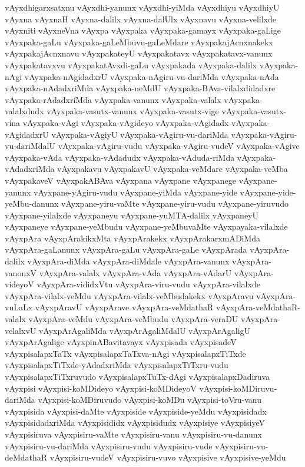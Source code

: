 {vAyxdhigarxsatxnu
vAyxdhi-yanunx
vAyxdhi-yiMda
vAyxdhiyu
vAyxdhiyU
vAyxna
vAyxnaH
vAyxna-dalilx
vAyxna-dalUlx
vAyxnavu
vAyxna-velilxde
vAyxniti
vAyxneVna
vAyxpa
vAyxpaka
vAyxpaka-gamayx
vAyxpaka-gaLige
vAyxpaka-gaLu
vAyxpaka-gaLeMbuvu-gaLeMdare
vAyxpakajAcnxnakekx
vAyxpakajAcnxnavu
vAyxpakateyU
vAyxpakatavx
vAyxpakatavx-vanunx
vAyxpakatavxvu
vAyxpakatAvxdi-gaLu
vAyxpakada
vAyxpaka-dalilx
vAyxpaka-nAgi
vAyxpaka-nAgidadxrU
vAyxpaka-nAgiru-vu-dariMda
vAyxpaka-nAda
vAyxpaka-nAdadxriMda
vAyxpaka-neMdU
vAyxpaka-BAva-vilalxdidadxre
vAyxpaka-rAdadxriMda
vAyxpaka-vanunx
vAyxpaka-valalx
vAyxpaka-valalxdudx
vAyxpaka-vasutx-vanunx
vAyxpaka-vasutx-vige
vAyxpaka-vasutx-vina
vAyxpaka-vAgi
vAyxpaka-vAgideyo
vAyxpaka-vAgidadx
vAyxpaka-vAgidadxrU
vAyxpaka-vAgiyU
vAyxpaka-vAgiru-vu-dariMda
vAyxpaka-vAgiru-vu-dariMdalU
vAyxpaka-vAgiru-vudu
vAyxpaka-vAgiru-vudeV
vAyxpaka-vAgive
vAyxpaka-vAda
vAyxpaka-vAdadudx
vAyxpaka-vAduda-riMda
vAyxpaka-vAdadxriMda
vAyxpakavu
vAyxpakavU
vAyxpaka-veMdare
vAyxpaka-veMba
vAyxpakaveV
vAyxpakABAva
vAyxpana
vAyxpane
vAyxpanege
vAyxpane-yanunx
vAyxpane-yAgiru-vudu
vAyxpane-yiMda
vAyxpane-yide
vAyxpane-yide-yeMbu-danunx
vAyxpane-yiru-vaMte
vAyxpane-yiru-vudu
vAyxpane-yiruvudo
vAyxpane-yilalxde
vAyxpaneyu
vAyxpane-yuMTA-dalilx
vAyxpaneyU
vAyxpaneye
vAyxpane-yeMbudu
vAyxpane-yeMbuvaMte
vAyxpayaka-vilalxde
vAyxpAra
vAyxpArakikxMta
vAyxpArakekx
vAyxpArakarxmADiMda
vAyxpAra-gaLanunx
vAyxpAra-gaLu
vAyxpAra-gaLe
vAyxpArada
vAyxpAra-dalilx
vAyxpAra-diMda
vAyxpAra-diMdale
vAyxpAra-vanunx
vAyxpAra-vanonxV
vAyxpAra-valalx
vAyxpAra-vAda
vAyxpAra-vAdarU
vAyxpAra-videyoV
vAyxpAra-vididxVtu
vAyxpAra-viru-vudu
vAyxpAra-vilalxde
vAyxpAra-vilalx-veMdu
vAyxpAra-vilalx-veMbudakekx
vAyxpAravu
vAyxpAra-vuLaLx
vAyxpAravU
vAyxpArave
vAyxpAra-veMdathaR
vAyxpAra-veMdathaR-valalx
vAyxpAra-veMdu
vAyxpAra-veMbudu
vAyxpAra-veraDU
vAyxpAra-velalxvU
vAyxpArAgaliMda
vAyxpArAgaliMdalU
vAyxpArAgaligU
vAyxpArAgalige
vAyxpinABavitavayx
vAyxpisada
vAyxpisadeV
vAyxpisalapxTaTx
vAyxpisalapxTaTxva-nAgi
vAyxpisalapxTiTxde
vAyxpisalapxTiTxde-yAdadxriMda
vAyxpisalapxTiTxru-vudu
vAyxpisalapxTiTxruvudo
vAyxpisalapxTuTx-dAgi
vAyxpisalapxDadiruva
vAyxpisi
vAyxpisi-koMDideyo
vAyxpisi-koMDideyoV
vAyxpisi-koMDiruvu-dariMda
vAyxpisi-koMDiruvudo
vAyxpisi-koMDu
vAyxpisi-toVru-vanu
vAyxpisida
vAyxpisi-daMte
vAyxpiside
vAyxpiside-yeMdu
vAyxpisidadx
vAyxpisidadxriMda
vAyxpisididx
vAyxpisidudx
vAyxpisiye
vAyxpisiyeV
vAyxpisiruva
vAyxpisiru-vaMte
vAyxpisiru-vanu
vAyxpisiru-vu-danunx
vAyxpisiru-vu-dariMda
vAyxpisiru-vudu
vAyxpisiru-vude
vAyxpisiru-vu-deMdathaR
vAyxpisiru-vudeV
vAyxpisiru-vuvo
vAyxpisive
vAyxpisive-yeMdu
}

